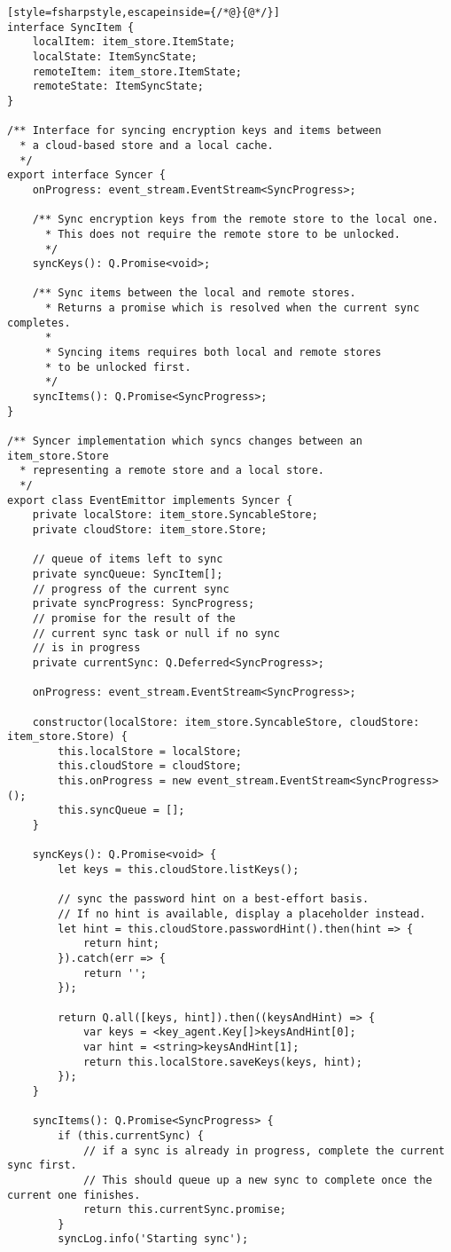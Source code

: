 \begin{lstlisting}[style=fsharpstyle,escapeinside={/*@}{@*/}]
interface SyncItem {
	localItem: item_store.ItemState;
	localState: ItemSyncState;
	remoteItem: item_store.ItemState;
	remoteState: ItemSyncState;
}

/** Interface for syncing encryption keys and items between
  * a cloud-based store and a local cache.
  */
export interface Syncer {
	onProgress: event_stream.EventStream<SyncProgress>;

	/** Sync encryption keys from the remote store to the local one.
	  * This does not require the remote store to be unlocked.
	  */
	syncKeys(): Q.Promise<void>;

	/** Sync items between the local and remote stores.
	  * Returns a promise which is resolved when the current sync completes.
	  *
	  * Syncing items requires both local and remote stores
	  * to be unlocked first.
	  */
	syncItems(): Q.Promise<SyncProgress>;
}

/** Syncer implementation which syncs changes between an item_store.Store
  * representing a remote store and a local store.
  */
export class EventEmittor implements Syncer {
	private localStore: item_store.SyncableStore;
	private cloudStore: item_store.Store;

	// queue of items left to sync
	private syncQueue: SyncItem[];
	// progress of the current sync
	private syncProgress: SyncProgress;
	// promise for the result of the
	// current sync task or null if no sync
	// is in progress
	private currentSync: Q.Deferred<SyncProgress>;

	onProgress: event_stream.EventStream<SyncProgress>;

	constructor(localStore: item_store.SyncableStore, cloudStore: item_store.Store) {
		this.localStore = localStore;
		this.cloudStore = cloudStore;
		this.onProgress = new event_stream.EventStream<SyncProgress>();
		this.syncQueue = [];
	}

	syncKeys(): Q.Promise<void> {
		let keys = this.cloudStore.listKeys();

		// sync the password hint on a best-effort basis.
		// If no hint is available, display a placeholder instead.
		let hint = this.cloudStore.passwordHint().then(hint => {
			return hint;
		}).catch(err => {
			return '';
		});

		return Q.all([keys, hint]).then((keysAndHint) => {
			var keys = <key_agent.Key[]>keysAndHint[0];
			var hint = <string>keysAndHint[1];
			return this.localStore.saveKeys(keys, hint);
		});
	}

	syncItems(): Q.Promise<SyncProgress> {
		if (this.currentSync) {
			// if a sync is already in progress, complete the current sync first.
			// This should queue up a new sync to complete once the current one finishes.
			return this.currentSync.promise;
		}
		syncLog.info('Starting sync');


\end{lstlisting}
